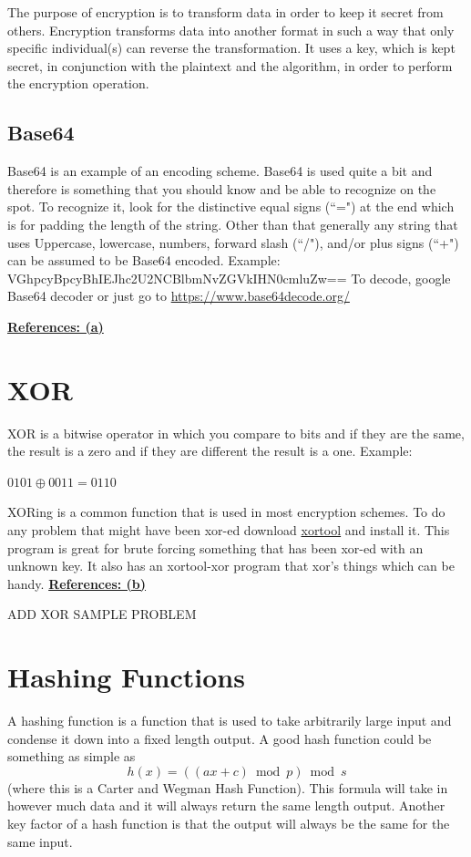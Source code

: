 \documentclass{report}
\begin{document}
The purpose of \color{blue} encryption \color{black} is to transform data in order to
keep it secret from others.  Encryption transforms data into another format in such a
way that only specific individual(s) can reverse the transformation. It uses a key, which
is kept secret, in conjunction with the plaintext and the algorithm, in order to perform 
the encryption operation. 

\subsection{Base64}
Base64 is an example of an encoding scheme.  Base64 is used quite a bit and therefore is something that you should know and be able to recognize on the spot.  To recognize it, look for the distinctive equal signs (``=") at the end which is for padding the length of the string.  Other than that generally any string that uses Uppercase, lowercase, numbers, forward slash (``/"), and/or plus signs (``+") can be assumed to be Base64 encoded.
Example: VGhpcyBpcyBhIEJhc2U2NCBlbmNvZGVkIHN0cmluZw==
To decode, google Base64 decoder or just go to \url{https://www.base64decode.org/}

\hyperref[ref:5]{\textbf{References: (a)}}

\section{XOR}
XOR is a bitwise operator in which you compare to bits and if they are the same, the result is a zero and if they are different the result is a one.  Example:


     				$0101 \oplus 0011  = 0110$
                                 
XORing is a common function that is used in most encryption schemes.
To do any problem that might have been xor-ed download \color{blue} \href{https://github.com/hellman/xortool}{xortool} \color{black} and install it.
This program is great for brute forcing something that has been xor-ed with an 
unknown key.  It also has an xortool-xor program that xor’s things which can be handy.
\hyperref[ref:5]{\textbf{References: (b)}} 

ADD XOR SAMPLE PROBLEM

\section{Hashing Functions}
A hashing function is a function that is used to take arbitrarily large input and 
condense it down into a fixed length output.  A good hash function could be something
as simple as 
\[h(x) = \left(\left(ax + c\right) \bmod p\right) \bmod s \]
(where this is a Carter and Wegman Hash Function).  This formula will take in however 
much data and it will always return the same length output.  Another key factor of a 
hash function is that the output will always be the same for the same input.  
\end{document}
